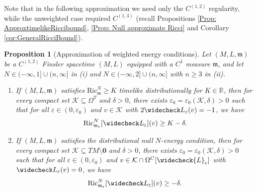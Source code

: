 \documentclass[a4paper,11pt]{article}
\numberwithin{equation}{section}
\theoremstyle{definition}
\theoremstyle{plain}
\newtheorem{Proposition}[Definition]{Proposition}
\newcommand{\R}{\mathbb R}
\newcommand{\eps}{\varepsilon}
\newcommand{\Ric}{\mathrm{Ric}}
\begin{document}
Note that in the following approximation we need only the $C^{(1,2)}$ regularity, while the unweighted case required $C^{(1,3)}$ (recall Propositions \ref{Prop: ApproxtimelikeRiccibound}, \ref{Prop: Null approximate Ricci} and Corollary \ref{cor:GeneralRicciBound}).

\begin{Proposition}[Approximation of weighted energy conditions]
\label{Prop: approx weighted energy conditions}
Let $(M,L,\mathfrak m)$ be a $C^{(1,2)}$ Finsler spacetime $(M,L)$ equipped with a $C^1$ measure $\mathfrak m$, and let $N \in (-\infty,1] \cup (n,\infty]$ in \textit{(i)} and $N \in (-\infty,2] \cup (n,\infty]$ with $n \ge 3$ in \textit{(ii)}.
\begin{enumerate}
    \item\label{appRN1}
    If $(M,L,\mathfrak m)$ satisfies $\Ric_{\mathfrak m}^N \ge K$ timelike distributionally for $K \in \R$, then for every compact set $\mathcal K \subseteq \Omega^T$ and $\delta > 0$, there exists $\varepsilon_0 = \varepsilon_0(\mathcal K,\delta) > 0$ such that for all $\varepsilon \in (0,\varepsilon_0)$ and $v \in \mathcal K$ with $2\widecheck L_\varepsilon(v) = -1$, we have
    \begin{equation}
    \label{eq:WeightedGeneralRicciApprox}
        \Ric^N_{\mathfrak m_\varepsilon}[\widecheck L_\varepsilon](v) \geq K - \delta.
    \end{equation}
    \item\label{appRN2}
    If $(M,L,\mathfrak m)$ satisfies the distributional null $N$-energy condition, then for every compact set $\mathcal K \subseteq TM \setminus \mathbf 0$ and $\delta > 0$, there exists $\varepsilon_0 = \varepsilon_0(\mathcal K,\delta) > 0$ such that for all $\varepsilon \in (0,\varepsilon_0)$ and $v \in \mathcal K \cap \Omega^C[\widecheck{L}_\eps]$ with $\widecheck L_\varepsilon(v) = 0$, we have
    \begin{equation*}
        \Ric^N_{\mathfrak m_\varepsilon}[\widecheck L_\varepsilon](v) \geq -\delta.
    \end{equation*}
\end{enumerate}
\end{Proposition}
\end{document}
